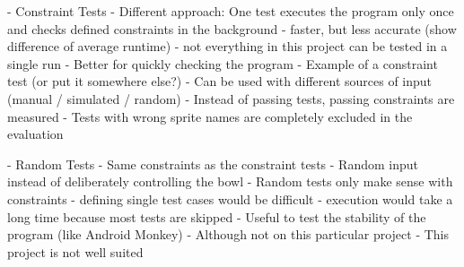 - Constraint Tests
    - Different approach: One test executes the program only once and checks defined constraints in the background
    - faster, but less accurate (show difference of average runtime)
    - not everything in this project can be tested in a single run
    - Better for quickly checking the program
    - Example of a constraint test (or put it somewhere else?)
    - Can be used with different sources of input (manual / simulated / random)
    - Instead of passing tests, passing constraints are measured
    - Tests with wrong sprite names are completely excluded in the evaluation

- Random Tests
    - Same constraints as the constraint tests
    - Random input instead of deliberately controlling the bowl
    - Random tests only make sense with constraints
        - defining single test cases would be difficult
        - execution would take a long time because most tests are skipped
    - Useful to test the stability of the program (like Android Monkey)
        - Although not on this particular project
    - This project is not well suited 

